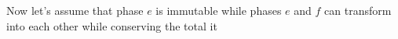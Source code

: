 Now let's assume that phase \(e\) is immutable while phases \(e\) and \(f\) can transform into each other while conserving the total it